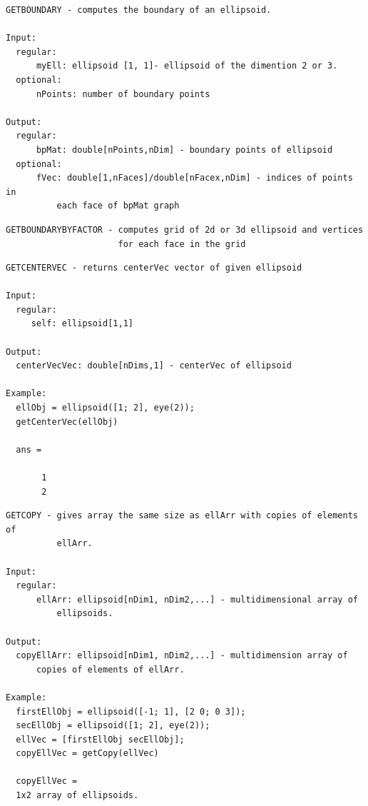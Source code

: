 \documentclass[letterpaper,10pt,english]{sphinxmanual}
\begin{document}
\begin{Verbatim}[commandchars=\\\{\}]
GETBOUNDARY - computes the boundary of an ellipsoid.

Input:
  regular:
      myEll: ellipsoid [1, 1]- ellipsoid of the dimention 2 or 3.
  optional:
      nPoints: number of boundary points

Output:
  regular:
      bpMat: double[nPoints,nDim] - boundary points of ellipsoid
  optional:
      fVec: double[1,nFaces]/double[nFacex,nDim] - indices of points in
          each face of bpMat graph
\end{Verbatim}

\begin{Verbatim}[commandchars=\\\{\}]
GETBOUNDARYBYFACTOR - computes grid of 2d or 3d ellipsoid and vertices
                      for each face in the grid
\end{Verbatim}

\begin{Verbatim}[commandchars=\\\{\}]
GETCENTERVEC - returns centerVec vector of given ellipsoid

Input:
  regular:
     self: ellipsoid[1,1]

Output:
  centerVecVec: double[nDims,1] - centerVec of ellipsoid

Example:
  ellObj = ellipsoid([1; 2], eye(2));
  getCenterVec(ellObj)

  ans =

       1
       2
\end{Verbatim}

\begin{Verbatim}[commandchars=\\\{\}]
GETCOPY - gives array the same size as ellArr with copies of elements of
          ellArr.

Input:
  regular:
      ellArr: ellipsoid[nDim1, nDim2,...] - multidimensional array of
          ellipsoids.

Output:
  copyEllArr: ellipsoid[nDim1, nDim2,...] - multidimension array of
      copies of elements of ellArr.

Example:
  firstEllObj = ellipsoid([-1; 1], [2 0; 0 3]);
  secEllObj = ellipsoid([1; 2], eye(2));
  ellVec = [firstEllObj secEllObj];
  copyEllVec = getCopy(ellVec)

  copyEllVec =
  1x2 array of ellipsoids.
\end{Verbatim}
\end{document}
